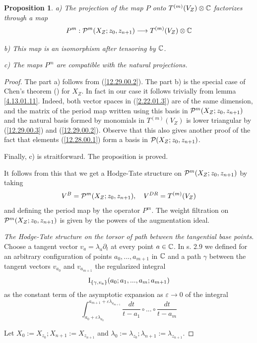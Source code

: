 \documentclass[10pt]{article}
\newtheorem{proposition}[theorem]{Proposition}
\begin{document}
\begin{proposition} \label{2.22.01.1} a) The projection of the  map $P$ onto $T^{(m)}(V_Z) \otimes {\mathbb C}$ 
factorizes through a map 
\begin{equation} \label{2.22.01.3}
P^m: {\cal P}^m(X_Z; z_0, z_{n+1}) \longrightarrow T^{(m)}(V_Z)\otimes {\mathbb C}
\end{equation} 

b) This map is an isomorphism after tensoring by ${\mathbb C}$. 

c) The maps $P^m$ are compatible with the natural projections. 
\end{proposition} 

\begin{proof} The part a) follows from (\ref{12.29.00.2}).
The part b) is the special case of Chen's theorem (\cite{Ch}) for $X_Z$. 
In fact in our case it 
follows trivially from lemma \ref{4.13.01.11}. Indeed, both vector spaces 
in (\ref{2.22.01.3}) are of the same dimension, and 
the matrix of the period map  written using  this basis
in ${\cal P}^m(X_Z; z_0, z_{n+1})$ and the natural basis formed by  
monomials in $T^{(m)}(V_Z)$ 
is lower triangular by (\ref{12.29.00.3}) and  (\ref{12.29.00.2}). 
Observe that this also gives another proof of the fact that elements (\ref{12.28.00.1})
 form a basis in ${\cal P}(X_Z; z_0, z_{n+1})$.

Finally, c) is straitforward. The proposition is proved. 


It follows from this that we get a Hodge-Tate structure 
on ${\cal P}^m(X_Z; z_0, z_{n+1})$ by taking 
$$
V^B = {\cal P}^m(X_Z; z_0, z_{n+1}), \quad V^{DR} = T^{(m)}(V_Z)
$$ 
and defining the period map by the operator $P^m$. The weight filtration on 
${\cal P}^m(X_Z; z_0, z_{n+1})$ is given by the powers of the augmentation ideal. 



{\it The  Hodge-Tate structure on the torsor of path between the tangential base points}.
Choose a tangent vector $v_{a} = \lambda_a \partial_t$ at every point $a \in {\mathbb C}$.  
In s. 2.9 we defined for an 
arbitrary configuration of points 
$a_0, ..., a_{m+1}$ 
in ${\mathbb C}$ and a path $\gamma$ between the tangent vectors $v_{a_0}$ and 
 $v_{a_{m+1}}$ the regularized integral
\begin{equation} \label{12.21.00.1}
{\rm I}_{\{\gamma, v_a\}}(a_0; a_1, ..., a_m; a_{m+1})
\end{equation} 
as the constant term of the  asymptotic expansion as $\varepsilon \to 0$ of 
the integral 
\begin{equation} \label{12.21.00.112}
\int_{a_0 + \varepsilon \lambda_{a_0}}^{a_{m+1} + \varepsilon \lambda_{a_{m+1}}} 
\frac{dt}{t-a_1} \circ ... \circ \frac{dt}{t-a_m}
\end{equation} 


Let $X_{0}:= X_{z_0}; X_{n+1}:= X_{z_{n+1}}$  and $\lambda_{0}:= \lambda_{z_0}; 
\lambda_{n+1}:= \lambda_{z_{n+1}}$.  


\end{proof}
\end{document}
